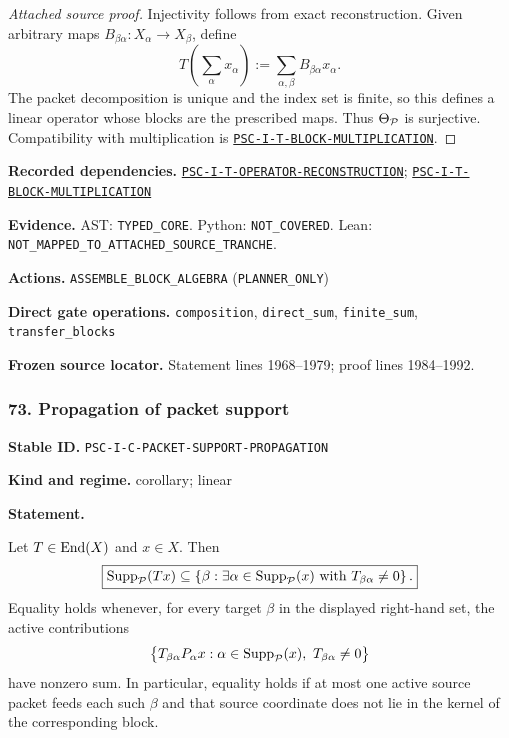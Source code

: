 \documentclass[a4paper,11pt]{article}
\newcommand{\field}[2]{\noindent\textbf{#1.} #2\par}
\begin{document}
\begin{proof}[Attached source proof]
Injectivity follows from exact reconstruction.  Given arbitrary maps $B_{\beta\alpha}:X_\alpha\to X_\beta$, define
\[
T\left(\sum_\alpha x_\alpha\right)
:=
\sum_{\alpha,\beta}B_{\beta\alpha}x_\alpha.
\]
The packet decomposition is unique and the index set is finite, so this defines a linear operator whose blocks are the prescribed maps.  Thus $\Theta_{\mathcal P}$ is surjective.  Compatibility with multiplication is \hyperref[rec:PSC-I-T-BLOCK-MULTIPLICATION]{\nolinkurl{PSC-I-T-BLOCK-MULTIPLICATION}}.
\end{proof}
\field{Recorded dependencies}{\hyperref[rec:PSC-I-T-OPERATOR-RECONSTRUCTION]{\nolinkurl{PSC-I-T-OPERATOR-RECONSTRUCTION}}; \hyperref[rec:PSC-I-T-BLOCK-MULTIPLICATION]{\nolinkurl{PSC-I-T-BLOCK-MULTIPLICATION}}}
\field{Evidence}{AST: \nolinkurl{TYPED_CORE}. Python: \nolinkurl{NOT_COVERED}. Lean: \nolinkurl{NOT_MAPPED_TO_ATTACHED_SOURCE_TRANCHE}.}
\field{Actions}{\nolinkurl{ASSEMBLE_BLOCK_ALGEBRA} (\nolinkurl{PLANNER_ONLY})}
\field{Direct gate operations}{\nolinkurl{composition}, \nolinkurl{direct_sum}, \nolinkurl{finite_sum}, \nolinkurl{transfer_blocks}}
\field{Frozen source locator}{Statement lines 1968--1979; proof lines 1984--1992.}
\subsubsection*{73. Propagation of packet support}
\label{rec:PSC-I-C-PACKET-SUPPORT-PROPAGATION}
\field{Stable ID}{\nolinkurl{PSC-I-C-PACKET-SUPPORT-PROPAGATION}}
\field{Kind and regime}{corollary; linear}
\textbf{Statement.}\par
Let \(T\in\operatorname{End}(X)\) and \(x\in X\).  Then
\[
\boxed{
\operatorname{Supp}_{\mathcal P}(Tx)
\subseteq
\left\{\beta:\exists\alpha\in\operatorname{Supp}_{\mathcal P}(x)
\text{ with }T_{\beta\alpha}\neq0\right\}.
}
\]
Equality holds whenever, for every target \(\beta\) in the displayed right-hand set, the active contributions
\[
\bigl\{T_{\beta\alpha}P_\alpha x:
\alpha\in\operatorname{Supp}_{\mathcal P}(x),\ T_{\beta\alpha}\neq0\bigr\}
\]
have nonzero sum.  In particular, equality holds if at most one active source packet feeds each such \(\beta\) and that source coordinate does not lie in the kernel of the corresponding block.
\end{document}
